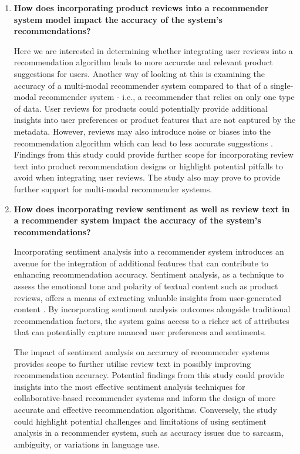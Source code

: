 \begin{enumerate}
    \item \textbf{How does incorporating product reviews into a recommender system model impact the accuracy of the system’s recommendations?} 
    
    Here we are interested in determining whether integrating user reviews into a recommendation algorithm leads to more accurate and relevant product suggestions for users. Another way of looking at this is examining the accuracy of a multi-modal recommender system compared to that of a single-modal recommender system - i.e., a recommender that relies on only one type of data. User reviews for products could potentially provide additional insights into user preferences or product features that are not captured by the metadata. However, reviews may also introduce noise or biases into the recommendation algorithm which can lead to less accurate suggestions \cite{zhang2014urcf}. Findings from this study could provide further scope for incorporating review text into product recommendation designs or highlight potential pitfalls to avoid when integrating user reviews. The study also may prove to provide further support for multi-modal recommender systems. 


    \item \textbf{How does incorporating review sentiment as well as review text in a recommender system impact the accuracy of the system's recommendations?} 
    
    Incorporating sentiment analysis into a recommender system introduces an avenue for the integration of additional features that can contribute to enhancing recommendation accuracy. Sentiment analysis, as a technique to assess the emotional tone and polarity of textual content such as product reviews, offers a means of extracting valuable insights from user-generated content \cite{medhat2014sentiment}. By incorporating sentiment analysis outcomes alongside traditional recommendation factors, the system gains access to a richer set of attributes that can potentially capture nuanced user preferences and sentiments. 

    The impact of sentiment analysis on accuracy of recommender systems provides scope to further utilise review text in possibly improving recommendation accuracy. Potential findings from this study could provide insights into the most effective sentiment analysis techniques for collaborative-based recommender systems and inform the design of more accurate and effective recommendation algorithms. Conversely, the study could highlight potential challenges and limitations of using sentiment analysis in a recommender system, such as accuracy issues due to sarcasm, ambiguity, or variations in language use. 


\end{enumerate}
